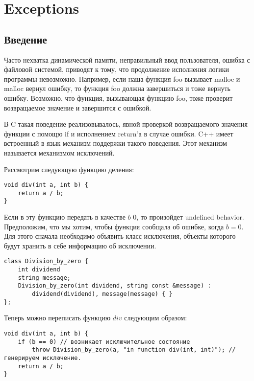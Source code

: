 \section{Exceptions}
\subsection{Введение}
Часто нехватка динамической памяти, неправильный ввод пользователя, ошибка с файловой системой, приводят к тому, что продолжение исполнения логики программы невозможно. Например, если наша функция foo вызывает malloc и malloc вернул ошибку, то функция foo должна завершиться и тоже вернуть ошибку. Возможно, что функция, вызывающая функцию foo, тоже проверит возвращаемое значение и завершится с ошибкой.

В C такая поведение реализовывалось, явной проверкой возвращаемого значения функции с помощю if и исполнением return'а в случае ошибки. C++ имеет встроенный в язык механизм поддержки такого поведения. Этот механизм называется механизмом исключений.

Рассмотрим следующую функцию деления:
\begin{verbatim}
void div(int a, int b) {
    return a / b;
}
\end{verbatim}

Если в эту функцию передать в качестве $b$ $0$, то произойдет undefined behavior. Предположим, что мы хотим, чтобы функция сообщала об ошибке, когда $b = 0$. Для этого сначала необходимо объявить класс исключения, объекты которого будут хранить в себе информацию об исключении.

\begin{verbatim}
class Division_by_zero {
    int dividend
    string message;
    Division_by_zero(int dividend, string const &message) :
        dividend(dividend), message(message) { }
};
\end{verbatim}

Теперь можно переписать функцию $div$ следующим образом:

\begin{verbatim}
void div(int a, int b) {
    if (b == 0) // возникает исключительное состояние
        throw Division_by_zero(a, "in function div(int, int)"); // генерируем исключение.
    return a / b;
}
\end{verbatim}

